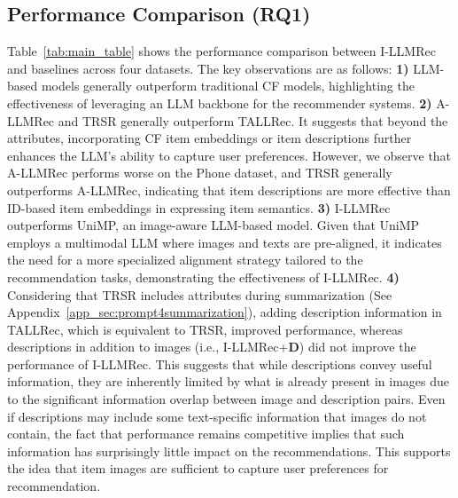 \documentclass[sigconf]{acmart}
\newcommand{\proposed}{\textsf{I-LLMRec}}
\begin{document}
\subsection{Performance Comparison (RQ1)}
\label{sec:performance}
Table~\ref{tab:main_table} shows the performance comparison between \proposed{} and baselines across four datasets. The key observations are as follows: \textbf{1)} LLM-based models generally outperform traditional CF models, highlighting the effectiveness of leveraging an LLM backbone for the recommender systems. 
\textbf{2)} A-LLMRec and TRSR generally outperform TALLRec. It suggests that beyond the attributes, incorporating CF item embeddings or item descriptions further enhances the LLM's ability to capture user preferences. However, we observe that A-LLMRec performs worse on the Phone dataset, and TRSR generally outperforms A-LLMRec, indicating that item descriptions are more effective than ID-based item embeddings in expressing item semantics.
\textbf{3)} \proposed{} outperforms UniMP, an image-aware LLM-based model. Given that UniMP employs a multimodal LLM where images and texts are pre-aligned, it indicates the need for a more specialized alignment strategy tailored to the recommendation tasks, demonstrating the effectiveness of \proposed{}.
\textbf{4)} {Considering that TRSR includes attributes during summarization (See Appendix~\ref{app_sec:prompt4summarization}), adding description information in TALLRec, which is equivalent to TRSR, improved performance, whereas descriptions in addition to images (i.e., \proposed{}+$\mathbf{D}$) did not improve the performance of \proposed{}.}
This suggests that while descriptions convey useful information, they are inherently limited by what is already present in images due to the significant information overlap between image and description pairs. Even if descriptions may include some text-specific information that images do not contain, the fact that performance remains competitive implies that such information has surprisingly little impact on the recommendations. This supports the idea that item images are sufficient to capture user preferences for recommendation.
\end{document}
